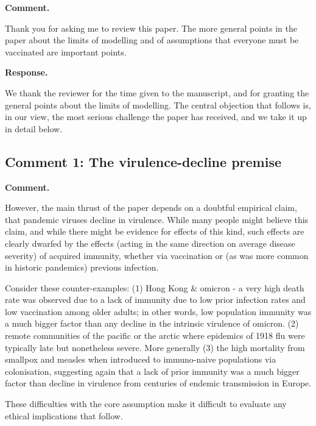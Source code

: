 \documentclass[a4paper,12pt]{article}
\newcommand{\reply}[1]{#1}
\newcommand{\rlabel}[1]{\par\medskip\noindent\textbf{#1}\par\nobreak}
\begin{document}
\rlabel{Comment.}
Thank you for asking me to review this paper. The more general points in the paper about the limits of modelling and of assumptions that everyone must be vaccinated are important points.

\rlabel{Response.}
\reply{We thank the reviewer for the time given to the manuscript, and for
granting the general points about the limits of modelling. The central
objection that follows is, in our view, the most serious challenge the paper
has received, and we take it up in detail below.}

\subsection*{Comment 1: The virulence-decline premise}

\rlabel{Comment.}
However, the main thrust of the paper depends on a doubtful empirical claim, that pandemic viruses decline in virulence. While many people might believe this claim, and while there might be evidence for effects of this kind, such effects are clearly dwarfed by the effects (acting in the same direction on average disease severity) of acquired immunity, whether via vaccination or (as was more common in historic pandemics) previous infection.

Consider these counter-examples: (1) Hong Kong \& omicron - a very high death rate was observed due to a lack of immunity due to low prior infection rates and low vaccination among older adults; in other words, low population immunity was a much bigger factor than any decline in the intrinsic virulence of omicron. (2) remote communities of the pacific or the arctic where epidemics of 1918 flu were typically late but nonetheless severe. More generally (3) the high mortality from smallpox and measles when introduced to immuno-naive populations via colonisation, suggesting again that a lack of prior immunity was a much bigger factor than decline in virulence from centuries of endemic transmission in Europe.

These difficulties with the core assumption make it difficult to evaluate any ethical implications that follow.
\end{document}
